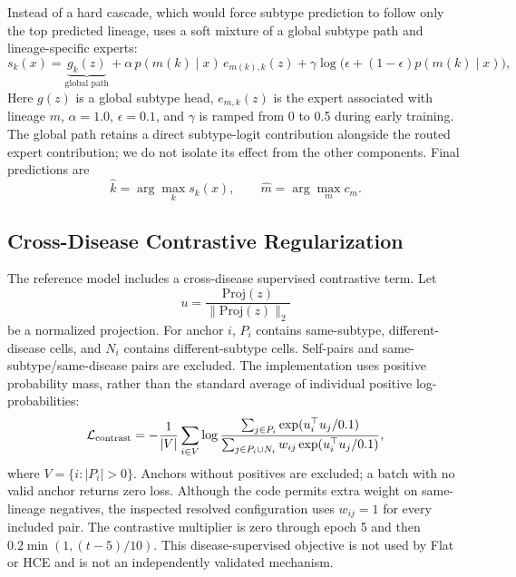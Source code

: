 Instead of a hard cascade, which would force subtype prediction to follow only the top predicted lineage, \ourmethod{} uses a soft mixture of a global subtype path and lineage-specific experts:
\begin{equation}
s_k(x) =
\underbrace{g_k(z)}_{\text{global path}}
+
\alpha \, p(m(k)\mid x) \, e_{m(k),k}(z)
+
\gamma \log\!\big(\epsilon + (1-\epsilon)p(m(k)\mid x)\big),
\label{eq:cascade}
\end{equation}
Here $g(z)$ is a global subtype head, $e_{m,k}(z)$ is the expert associated with lineage $m$, $\alpha=1.0$, $\epsilon=0.1$, and $\gamma$ is ramped from 0 to 0.5 during early training. The global path retains a direct subtype-logit contribution alongside the routed expert contribution; we do not isolate its effect from the other components. Final predictions are
\begin{equation}
\hat{k} = \arg\max_k s_k(x),
\qquad
\hat{m} = \arg\max_m c_m.
\end{equation}

\subsection{Cross-Disease Contrastive Regularization}
\label{sec:method:contrastive}

The reference model includes a cross-disease supervised contrastive term. Let
\begin{equation}
u = \frac{\mathrm{Proj}(z)}{\lVert \mathrm{Proj}(z) \rVert_2}
\end{equation}
be a normalized projection. For anchor $i$, $P_i$ contains same-subtype,
different-disease cells, and $N_i$ contains different-subtype cells. Self-pairs
and same-subtype/same-disease pairs are excluded. The implementation uses
positive probability mass, rather than the standard average of individual
positive log-probabilities:
\begin{equation}
\mathcal L_{\rm contrast}=-\frac{1}{|V|}\sum_{i\in V}
\log\frac{\sum_{j\in P_i}\exp(u_i^\top u_j/0.1)}
{\sum_{j\in P_i\cup N_i}w_{ij}\exp(u_i^\top u_j/0.1)},
\end{equation}
where $V=\{i:|P_i|>0\}$. Anchors without positives are excluded; a batch
with no valid anchor returns zero loss. Although the code permits extra
weight on same-lineage negatives, the inspected resolved configuration uses
$w_{ij}=1$ for every included pair. The contrastive multiplier is zero through
epoch 5 and then $0.2\min(1,(t-5)/10)$. This disease-supervised objective is
not used by Flat or HCE and is not an independently validated mechanism.

